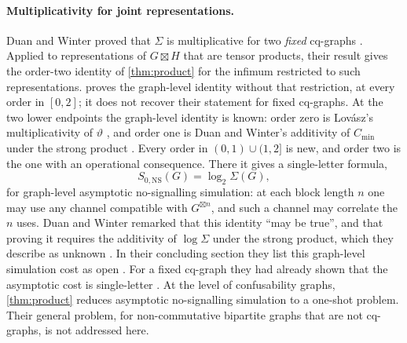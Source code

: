 \documentclass[11pt]{article}
\theoremstyle{definition}
\newcommand{\vt}{\vartheta}
\newcommand{\Cmin}{C_{\min}}
\newcommand{\SNS}{S_{0,\mathrm{NS}}}
\newcommand{\boxt}{\boxtimes}
\begin{document}
\paragraph{Multiplicativity for joint representations.}
Duan and Winter proved that $\Sigma$ is multiplicative for two \emph{fixed}
cq-graphs \cite[Proposition~18]{DuanWinter2016}.  Applied to representations
of $G\boxt H$ that are tensor products, their result gives the order-two
identity of \cref{thm:product} for the infimum restricted to such
representations.   proves the graph-level identity without
that restriction, at every order in $[0,2]$; it does not recover their
statement for fixed cq-graphs.  At the two lower endpoints the graph-level
identity is known: order zero
is Lov\'asz's multiplicativity of $\vt$ \cite{Lovasz1979}, and order one is
Duan and Winter's additivity of $\Cmin$ under the strong product
\cite[Lemma~23]{DuanWinter2016}.  Every order in $(0,1)\cup(1,2]$ is new, and
order two is the one with an operational consequence.  There it gives a
single-letter formula,
\[
 \SNS(G)=\log_2\Sigma(G),
\]
for graph-level asymptotic no-signalling simulation: at each block length $n$
one may use any channel compatible with $G^{\boxt n}$, and such a
channel may correlate the $n$ uses.  Duan and Winter remarked that this
identity ``may be true'', and that proving it requires the additivity of
$\log\Sigma$ under the strong product, which they describe as unknown
\cite[Section~V]{DuanWinter2016}.  In their concluding section they list this
graph-level simulation cost as open \cite[Section~VII]{DuanWinter2016}.  For
a fixed cq-graph they had already shown that the asymptotic cost is
single-letter \cite[Proposition~18 and Theorem~19]{DuanWinter2016}.  At the
level of confusability graphs, \cref{thm:product} reduces asymptotic
no-signalling simulation to a one-shot problem.  Their general problem, for
non-commutative bipartite graphs that are not cq-graphs, is not addressed
here.
\end{document}
